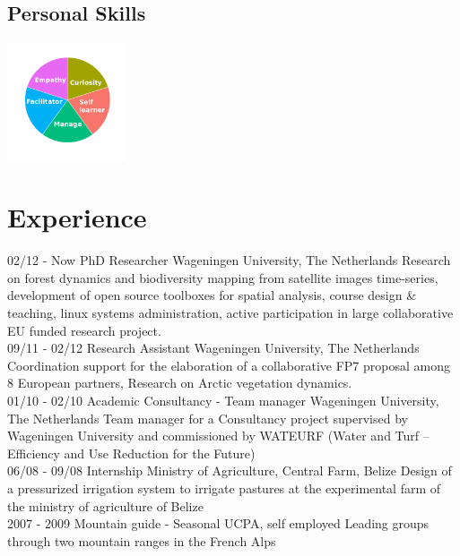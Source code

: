 \documentclass[]{friggeri-cv}
\begin{document}
\begin{aside}
  \section{Personal Skills}
    \includegraphics[width=3.5cm]{img/personal.png}
    ~
\end{aside}

\section{Experience}
\begin{entrylist}
  \entry
    {02/12 - Now}
    {PhD Researcher}
    {Wageningen University, The Netherlands}
    {Research on forest dynamics and biodiversity mapping from satellite images time-series, development of open source toolboxes for spatial analysis, course design \& teaching, linux systems administration, active participation in large collaborative EU funded research project.\\}
  \entry
    {09/11 - 02/12}
    {Research Assistant}
    {Wageningen University, The Netherlands}
    {Coordination support for the elaboration of a collaborative FP7 proposal among 8 European partners, Research on Arctic vegetation dynamics.\\}
    \entry
    {01/10 - 02/10}
    {Academic Consultancy - Team manager}
    {Wageningen University, The Netherlands}
    {Team manager for a Consultancy project supervised by Wageningen University and commissioned by WATEURF (Water and Turf – Efficiency and Use Reduction for the Future)\\}
    \entry
    {06/08 - 09/08}
    {Internship}
    {Ministry of Agriculture, Central Farm, Belize}
    {Design of a pressurized irrigation system to irrigate pastures at the experimental farm of the ministry of agriculture of Belize\\}
    \entry
    {2007 - 2009}
    {Mountain guide - Seasonal}
    {UCPA, self employed}
    {Leading groups through two mountain ranges in the French Alps}
\end{entrylist}
\end{document}
